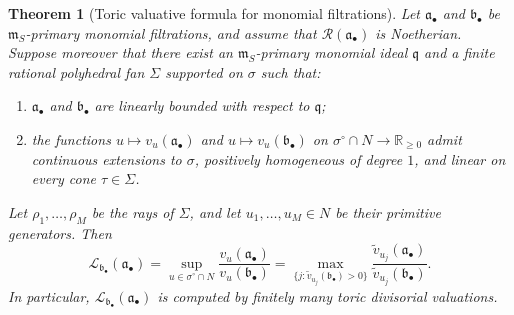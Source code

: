 \documentclass[12pt]{amsart}
\newcommand{\RR}{\mathbb{R}}
\newcommand{\m}{\mathfrak m}
\newcommand{\q}{\mathfrak q}
\renewcommand{\a}{\mathfrak{a}}
\renewcommand{\b}{\mathfrak{b}}
\newcommand{\R}{\mathcal{R}}
\newcommand{\Loj}{\mathcal{L}} %
\newcommand{\abul}{{\a_\bullet}}
\newcommand{\bbul}{{\b_\bullet}}
\theoremstyle{plain}
\newtheorem{theorem}{Theorem}[section]
\theoremstyle{definition}
\numberwithin{equation}{section}
\begin{document}
\begin{theorem}[Toric valuative formula for monomial filtrations] \label{thm:toric-filtration-formula}
	Let $\abul$ and $\bbul$ be $\m_S$-primary monomial filtrations, and assume that $\R(\abul)$ is Noetherian. Suppose moreover that there exist an $\m_S$-primary monomial ideal $\q$ and a finite rational polyhedral fan $\Sigma$ supported on $\sigma$ such that:
	\begin{enumerate}
		\item $\abul$ and $\bbul$ are linearly bounded with respect to $\q$;
		\item the functions $u \mapsto v_u(\abul)$ and $u \mapsto v_u(\bbul)$ on $\sigma^\circ\cap N \to \RR_{\ge0}$ admit continuous extensions to $\sigma$, positively homogeneous of degree $1$, and linear on every cone $\tau\in\Sigma$. 
	\end{enumerate}
	Let $\rho_1,\dots,\rho_M$ be the rays of $\Sigma$, and let $u_1,\dots,u_M\in N$ be their primitive generators. Then
	$$
	\Loj_{\bbul}(\abul)
	=
	\sup_{u\in\sigma^\circ\cap N}\frac{v_u(\abul)}{v_u(\bbul)}
	=
	\max_{\{j:\widetilde v_{u_j}(\bbul)>0\}}
	\frac{\widetilde v_{u_j}(\abul)}{\widetilde v_{u_j}(\bbul)}.
	$$
	In particular, $\Loj_{\bbul}(\abul)$ is computed by finitely many toric divisorial valuations.
\end{theorem}
\end{document}
